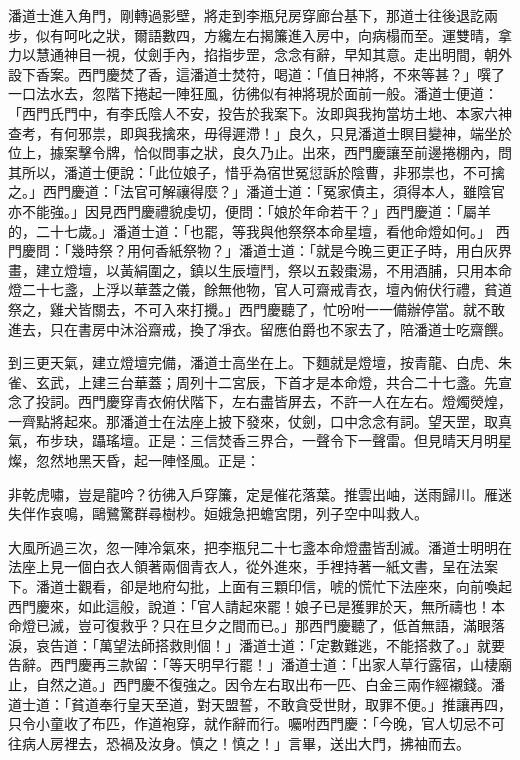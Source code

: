 潘道士進入角門，剛轉過影壁，將走到李瓶兒房穿廊台基下，那道士往後退訖兩步，似有呵叱之狀，爾語數四，方纔左右揭簾進入房中，向病榻而至。運雙晴，拿力以慧通神目一視，仗劍手內，掐指步罡，念念有辭，早知其意。走出明間，朝外設下香案。西門慶焚了香，這潘道士焚符，喝道：「值日神將，不來等甚？」噀了一口法水去，忽階下捲起一陣狂風，彷彿似有神將現於面前一般。潘道士便道：「西門氏門中，有李氏陰人不安，投告於我案下。汝即與我拘當坊土地、本家六神查考，有何邪祟，即與我擒來，毋得遲滯！」良久，只見潘道士瞑目變神，端坐於位上，據案擊令牌，恰似問事之狀，良久乃止。出來，西門慶讓至前邊捲棚內，問其所以，潘道士便說：「此位娘子，惜乎為宿世冤愆訴於陰曹，非邪祟也，不可擒之。」西門慶道：「法官可解禳得麼？」潘道士道：「冤家債主，須得本人，雖陰官亦不能強。」因見西門慶禮貌虔切，便問：「娘於年命若干？」西門慶道：「屬羊的，二十七歲。」潘道士道：「也罷，等我與他祭祭本命星壇，看他命燈如何。」 西門慶問：「幾時祭？用何香紙祭物？」潘道士道：「就是今晚三更正子時，用白灰界畫，建立燈壇，以黃絹圍之，鎮以生辰壇鬥，祭以五穀棗湯，不用酒脯，只用本命燈二十七盞，上浮以華蓋之儀，餘無他物，官人可齋戒青衣，壇內俯伏行禮，貧道祭之，雞犬皆關去，不可入來打攪。」西門慶聽了，忙吩咐一一備辦停當。就不敢進去，只在書房中沐浴齋戒，換了凈衣。留應伯爵也不家去了，陪潘道士吃齋饌。

到三更天氣，建立燈壇完備，潘道士高坐在上。下麵就是燈壇，按青龍、白虎、朱雀、玄武，上建三台華蓋；周列十二宮辰，下首才是本命燈，共合二十七盞。先宣念了投詞。西門慶穿青衣俯伏階下，左右盡皆屏去，不許一人在左右。燈燭熒煌，一齊點將起來。那潘道士在法座上披下發來，仗劍，口中念念有詞。望天罡，取真氣，布步玦，躡瑤壇。正是：三信焚香三界合，一聲令下一聲雷。但見晴天月明星燦，忽然地黑天昏，起一陣怪風。正是：

非乾虎嘯，豈是龍吟？彷彿入戶穿簾，定是催花落葉。推雲出岫，送雨歸川。雁迷失伴作哀鳴，鷗鷺驚群尋樹杪。姮娥急把蟾宮閉，列子空中叫救人。

大風所過三次，忽一陣冷氣來，把李瓶兒二十七盞本命燈盡皆刮滅。潘道士明明在法座上見一個白衣人領著兩個青衣人，從外進來，手裡持著一紙文書，呈在法案下。潘道士觀看，卻是地府勾批，上面有三顆印信，唬的慌忙下法座來，向前喚起西門慶來，如此這般，說道：「官人請起來罷！娘子已是獲罪於天，無所禱也！本命燈已滅，豈可復救乎？只在旦夕之間而已。」那西門慶聽了，低首無語，滿眼落淚，哀告道：「萬望法師搭救則個！」潘道士道：「定數難逃，不能搭救了。」就要告辭。西門慶再三款留：「等天明早行罷！」潘道士道：「出家人草行露宿，山棲廟止，自然之道。」西門慶不復強之。因令左右取出布一匹、白金三兩作經襯錢。潘道士道：「貧道奉行皇天至道，對天盟誓，不敢貪受世財，取罪不便。」推讓再四，只令小童收了布匹，作道袍穿，就作辭而行。囑咐西門慶：「今晚，官人切忌不可往病人房裡去，恐禍及汝身。慎之！慎之！」言畢，送出大門，拂袖而去。

